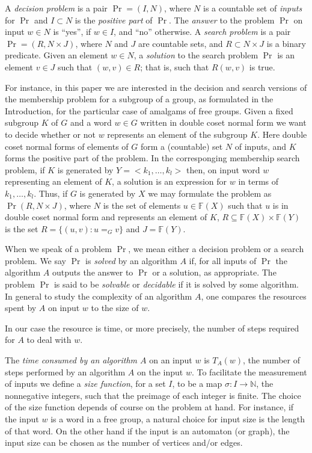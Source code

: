 \documentclass[a4paper,12pt]{article}
\numberwithin{equation}{section}
\numberwithin{figure}{section}
\newcommand{\FF}{\ensuremath{\mathbb{F}}}
\begin{document}
A \emph{decision problem} is a pair $\Pr = (I,N)$, where $N$ is a countable
set of \emph{inputs} for $\Pr$ and $I\subset N$ is the \emph{positive part} of
$\Pr$. The \emph{answer} to the problem $\Pr$ on  input $w\in N$ is ``yes'', 
if $w\in I$, 
and ``no'' otherwise. A \emph{search problem} is a pair 
$\Pr = (R,N\times J)$, where $N$ and $J$
are countable sets, and $R\subset N\times J$ is a binary predicate.
Given an element $w\in N$, a \emph{solution} to the search problem 
$\Pr$ is an element $v\in J$ such
that $(w,v)\in R$; that is, such that $R(w,v)$ is true.


For instance, in this paper we are interested in the decision and search 
versions of the membership problem for a subgroup of a group, as formulated
in the Introduction, for the particular case of amalgams of free groups. 
Given 
 a fixed subgroup $K$ of $G$ and a word $w \in G$ written in 
double coset normal form we want to decide
whether or not $w$ represents an element of  the subgroup $K$. 
Here double coset normal forms of elements of $G$ form a (countable) 
set $N$ of inputs, and $K$ forms the positive part of the problem. 
In  the corresponging membership search problem, if $K$ is    
generated by $Y=<k_1, \ldots, k_l>$ then, on input word $w$ representing an element
of $K$, a solution is an expression for $w$ in terms of $k_1, \ldots, k_l$.
Thus, if $G$ is generated by $X$ we may formulate the problem as 
$\Pr(R,N\times J)$, where $N$ is the set of elements $u\in \FF(X)$ such 
that $u$ is in double coset normal form and represents an element of $K$, 
$R\subseteq \FF(X)\times \FF(Y)$ is the set $R=\{(u,v): u=_G v\}$ and 
$J=\FF(Y)$.

When we speak of a problem $\Pr$, we mean either a decision problem
or a search problem. 
 We say $\Pr$ is \emph{solved} by an algorithm $A$ if, for all inputs of $\Pr$ the
algorithm $A$ outputs the answer to $\Pr$ or a solution, as appropriate.  
The problem $\Pr$ is said to be \emph{solvable} or \emph{decidable} if it is
solved by some algorithm.    
 In general to study the complexity of an algorithm $A$,
one compares the resources spent by $A$ on input $w$ to the size of
$w$. 

In our case the resource is time, or more precisely, the number
of steps required for $A$ to deal with $w$.

The \emph{time consumed by an algorithm $A$} on an input $w$ is
$T_{A}(w)$, the number of steps performed by an algorithm $A$ on
the input $w$. To facilitate the measurement of inputs we define a
 \emph{size function}, for a set $I$, to be a map $\sigma:I\to \mathbb N$, the
nonnegative integers, such that the preimage of each integer is
finite. 
The choice of the size function depends of course on the problem at hand.
For instance, if the input $w$ is a word in a free group, a natural 
choice for input size is the length of that word. 
On the other hand  if the input is 
an automaton (or graph), the input size can be chosen as the number of vertices and/or edges.
\end{document}
